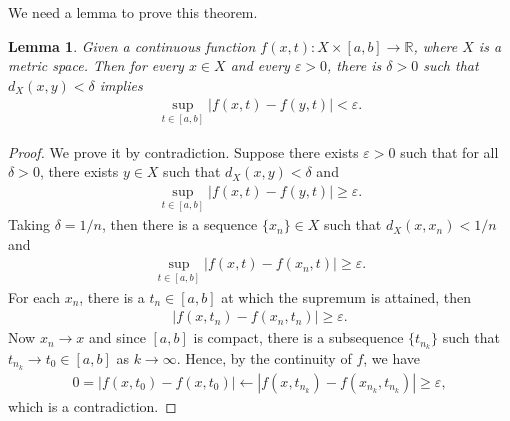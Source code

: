 \documentclass[10pt]{book}
\newtheorem{lemma}{Lemma}[chapter]
\theoremstyle{definition}
\numberwithin{equation}{chapter}
\begin{document}
\medskip

We need a lemma to prove this theorem.

\medskip

\begin{lemma}\label{lemma_73}
Given a continuous function $f(x,t): X \times [a,b] \to \mathbb{R}$, where $X$ is a metric space. Then for every $x \in X$ and every $\varepsilon > 0$, there is $\delta > 0$ such that $d_X(x,y) < \delta$ implies
\begin{align*}
    \sup_{t\in[a,b]} \left|f(x,t) - f(y,t)\right| < \varepsilon.
\end{align*}
\end{lemma}
\begin{proof}
We prove it by contradiction. Suppose there exists $\varepsilon > 0$ such that for all $\delta > 0$, there exists $y \in X$ such that $d_X(x,y) < \delta$ and
\begin{align*}
    \sup_{t\in[a,b]} \left|f(x,t) - f(y,t)\right| \geq \varepsilon.
\end{align*}
Taking $\delta = 1/n$, then there is a sequence $\{x_n\} \in X$ such that $d_X(x,x_n) < 1/n$ and
\begin{align*}
    \sup_{t\in[a,b]} \left|f(x,t) - f(x_n,t)\right| \geq \varepsilon.
\end{align*}
For each $x_n$, there is a $t_n \in [a,b]$ at which the supremum is attained, then
\begin{align*}
    \left|f(x,t_n) - f(x_n,t_n)\right| \geq \varepsilon.
\end{align*}
Now $x_n \to x$ and since $[a,b]$ is compact, there is a subsequence $\{t_{n_k}\}$ such that $t_{n_k} \to t_0 \in [a,b]$ as $k \to \infty$. Hence, by the continuity of $f$, we have
\begin{align*}
    0 = \left|f(x,t_0) - f(x,t_0)\right| \leftarrow \left|f(x,t_{n_k}) - f(x_{n_k},t_{n_k})\right| \geq \varepsilon,
\end{align*}
which is a contradiction.
\end{proof}

\medskip
\end{document}
